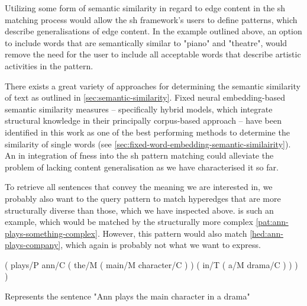 \documentclass[11pt]{scrreprt}
\let\cite\parencite  %
\begin{document}
Utilizing some form of semantic similarity in regard to edge content in the \gls{sh} matching process would allow the \gls{sh} framework's users to define patterns, which describe generalisations of edge content. In the example outlined above, an option to include words that are semantically similar to "piano" and "theatre", would remove the need for the user to include all acceptable words that describe artistic activities in the pattern. 

There exists a great variety of approaches for determining the semantic similarity of text as outlined in \cref{sec:semantic-similarity}. Fixed neural embedding-based semantic similarity measures -- specifically hybrid models, which integrate structural knowledge in their principally corpus-based approach -- have been identified in this work as one of the best performing methods to determine the similarity of single words (see \cref{sec:fixed-word-embedding-semantic-similairity}).
An in integration of \gls{fness} into the \gls{sh} pattern matching could alleviate the problem of lacking content generalisation as we have characterised it so far.


To retrieve all sentences that convey the meaning we are interested in, we probably also want to the query pattern to match hyperedges that are more structurally diverse than those, which we have inspected above.  is such an example, which would be matched by the structurally more complex \cref{pat:ann-plays-something-complex}. However, this pattern would also match \cref{hed:ann-plays-company}, which again is probably not what we want to express. 

\begin{hedge}[h!]
  \normalfont\sffamily
  \centering
 ( plays/P ann/C ( the/M ( main/M character/C ) ) ( in/T ( a/M drama/C ) ) ) )
  \caption{Represents the sentence "Ann plays the main character in a drama"}
  \label{hed:ann-plays-drama}
\end{hedge}
\end{document}
